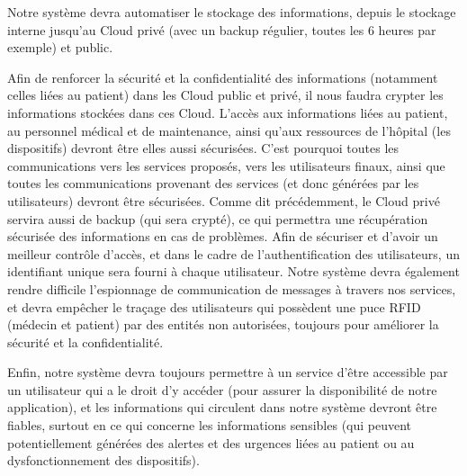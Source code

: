 Notre système devra automatiser le stockage des informations, depuis le stockage interne jusqu'au Cloud privé (avec un backup régulier, toutes les 6 heures par exemple) et public.

Afin de renforcer la sécurité et la confidentialité des informations (notamment celles liées au patient) dans les Cloud public et privé, il nous faudra crypter les informations stockées dans ces Cloud. L'accès aux informations liées au patient, au personnel médical et de maintenance, ainsi qu'aux ressources de l'hôpital (les dispositifs) devront être elles aussi sécurisées. C'est pourquoi toutes les communications vers les services proposés, vers les utilisateurs finaux, ainsi que toutes les communications provenant des services (et donc générées par les utilisateurs) devront être sécurisées. Comme dit précédemment, le Cloud privé servira aussi de backup (qui sera crypté), ce qui permettra une récupération sécurisée des informations en cas de problèmes. Afin de sécuriser et d'avoir un meilleur contrôle d'accès, et dans le cadre de l'authentification des utilisateurs, un identifiant unique sera fourni à chaque utilisateur. Notre système devra également rendre difficile l'espionnage de communication de messages à travers nos services, et devra empêcher le traçage des utilisateurs qui possèdent une puce RFID (médecin et patient) par des entités non autorisées, toujours pour améliorer la sécurité et la confidentialité. 

Enfin, notre système devra toujours permettre à un service d'être accessible par un utilisateur qui a le droit d'y accéder (pour assurer la disponibilité de notre application), et les informations qui circulent dans notre système devront être fiables, surtout en ce qui concerne les informations sensibles (qui peuvent potentiellement générées des alertes et des urgences liées au patient ou au dysfonctionnement des dispositifs).